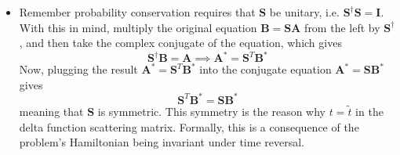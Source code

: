 \documentclass[11pt, a4paper]{article}
\renewcommand{\vec}[1]{\bm{#1}} %
\newcommand{\mat}[1]{\mathbf{#1}} %
\begin{document}
\begin{itemize}
	\item Remember probability conservation requires that $ \mat{S} $ be unitary, i.e. $ \mat{S}^{\dagger}\mat{S} = \mat{I} $. With this in mind, multiply the original equation $ \vec{B} = \mat{S} \vec{A} $ from the left by $ \mat{S}^{\dagger} $, and then take the complex conjugate of the equation, which gives
	\begin{equation*}
		\mat{S}^{\dagger}\mat{B} = \mat{A} \implies \mat{A}^{*} = \mat{S}^{T} \mat{B}^{*}
	\end{equation*}
	Now, plugging the result $ \mat{A}^{*} = \mat{S}^{T} \mat{B}^{*} $ into the conjugate equation $ \vec{A}^{*} = \mat{S} \vec{B}^{*} $ gives
	\begin{equation*}
		\mat{S}^{T} \mat{B}^{*} = \mat{S} \vec{B}^{*}
	\end{equation*}
	meaning that $ \mat{S} $ is symmetric. This symmetry is the reason why $ t = \tilde{t} $ in the delta function scattering matrix. Formally, this is a consequence of the problem's Hamiltonian being invariant under time reversal. 


\end{itemize}
\end{document}
